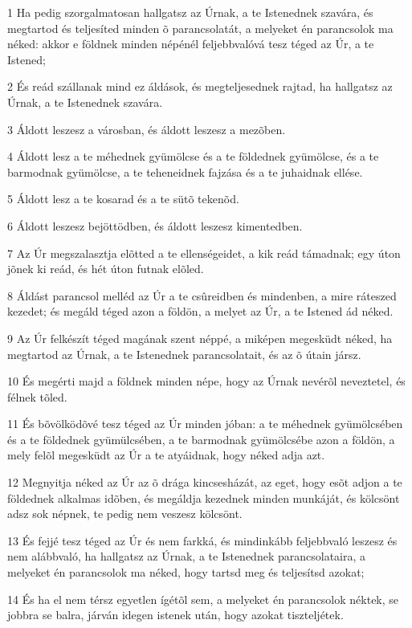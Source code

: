 \par 1 Ha pedig szorgalmatosan hallgatsz az Úrnak, a te Istenednek szavára, és megtartod és teljesíted minden õ parancsolatát, a melyeket én parancsolok ma néked: akkor e földnek minden népénél feljebbvalóvá tesz téged az Úr, a te Istened;
\par 2 És reád szállanak mind ez áldások, és megteljesednek rajtad, ha hallgatsz az Úrnak, a te Istenednek szavára.
\par 3 Áldott leszesz a városban, és áldott leszesz a mezõben.
\par 4 Áldott lesz a te méhednek gyümölcse és a te földednek gyümölcse, és a te barmodnak gyümölcse, a te teheneidnek fajzása és a te juhaidnak ellése.
\par 5 Áldott lesz a te kosarad és a te sütõ tekenõd.
\par 6 Áldott leszesz bejöttödben, és áldott leszesz kimentedben.
\par 7 Az Úr megszalasztja elõtted a te ellenségeidet, a kik reád támadnak; egy úton jõnek ki reád, és hét úton futnak elõled.
\par 8 Áldást parancsol melléd az Úr a te csûreidben és mindenben, a mire ráteszed kezedet; és megáld téged azon a földön, a melyet az Úr, a te Istened ád néked.
\par 9 Az Úr felkészít téged magának szent néppé, a miképen megesküdt néked, ha megtartod az Úrnak, a te Istenednek parancsolatait, és az õ útain jársz.
\par 10 És megérti majd a földnek minden népe, hogy az Úrnak nevérõl neveztetel, és félnek tõled.
\par 11 És bõvölködõvé tesz téged az Úr minden jóban: a te méhednek gyümölcsében és a te földednek gyümülcsében, a te barmodnak gyümölcsébe azon a földön, a mely felõl megesküdt az Úr a te atyáidnak, hogy néked adja azt.
\par 12 Megnyitja néked az Úr az õ drága kincsesházát, az eget, hogy esõt adjon a te földednek alkalmas idõben, és megáldja kezednek minden munkáját, és kölcsönt adsz sok népnek, te pedig nem veszesz kölcsönt.
\par 13 És fejjé tesz téged az Úr és nem farkká, és mindinkább feljebbvaló leszesz és nem alábbvaló, ha hallgatsz az Úrnak, a te Istenednek parancsolataira, a melyeket én parancsolok ma néked, hogy tartsd meg és teljesítsd azokat;
\par 14 És ha el nem térsz egyetlen ígétõl sem, a melyeket én parancsolok néktek, se jobbra se balra, járván idegen istenek után, hogy azokat tiszteljétek.
